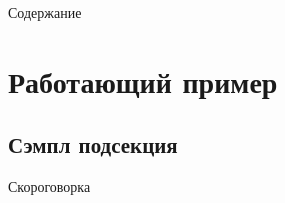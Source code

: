 \documentclass[12pt,aspectratio=169,svgnames]{beamer}
\begin{document}
 \maketitle

\begin{frame}{Содержание}
	\tableofcontents
\end{frame}

\section{Работающий пример}

\subsection{Сэмпл подсекция}

\begin{frame} 
	Скороговорка
\end{frame}
\end{document}
